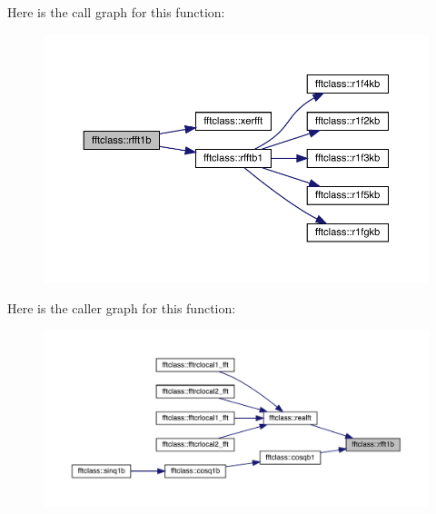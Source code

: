 Here is the call graph for this function\+:\nopagebreak
\begin{figure}[H]
\begin{center}
\leavevmode
\includegraphics[width=350pt]{namespacefftclass_a2bdd31e65a4abb79ed9e0eeaa71cee6b_cgraph}
\end{center}
\end{figure}
Here is the caller graph for this function\+:\nopagebreak
\begin{figure}[H]
\begin{center}
\leavevmode
\includegraphics[width=350pt]{namespacefftclass_a2bdd31e65a4abb79ed9e0eeaa71cee6b_icgraph}
\end{center}
\end{figure}
\mbox{\label{namespacefftclass_ad5aa2059236e01ea65aecda114c3f45f}} 
